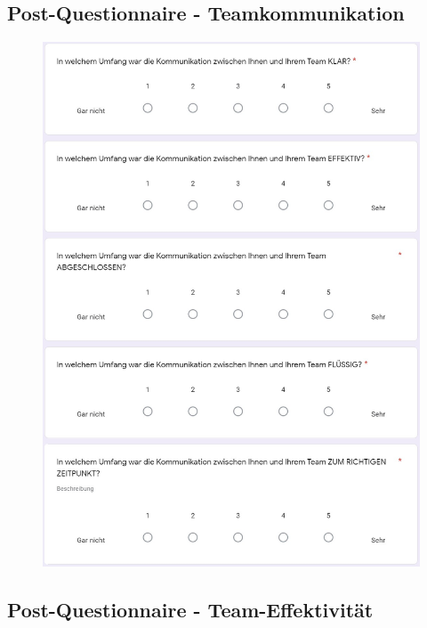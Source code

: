 \documentclass[a4paper,11pt]{article}%
\renewcommand{\\}{\vspace*{0.5\baselineskip} \newline}
\begin{document}
\newpage
\subsection{Post-Questionnaire - Teamkommunikation}	
\label{Post-Questionnaire - Teamkommunikation}	

\begin{figure}[H]
	\centering
		\begin{footnotesize}
			\includegraphics[scale=0.4]{Abbildungen/Fragebogen/Post-Questionnaire/PQKQ1}
		\end{footnotesize}
	\end{figure}	

\newpage
\subsection{Post-Questionnaire - Team-Effektivität}	
\label{Post-Questionnaire - Team-Effektivität}	
\end{document}
